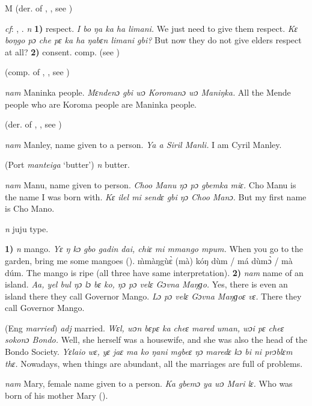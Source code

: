 \begin{letter}{M}
 (der. of , , see ) 

 \textit{cf}: , . \textit{n} \textbf{1)} respect. \textit{I bo ŋa ka ha limani.} We just need to give them respect. \textit{Kɛ boŋgo pɔ che pɛ ka ha ŋabɛn limani gbi?} But now they do not give elders respect at all? \textbf{2)} consent. comp.  (see ) 

 (comp. of , , see ) 

 \textit{nam} Maninka people. \textit{Mɛndenɔ gbi wɔ Koromanɔ wɔ Maniŋka.} All the Mende people who are Koroma people are Maninka people.

 (der. of , , see ) 

 \textit{nam} Manley, name given to a person. \textit{Ya a Siril Manli.} I am Cyril Manley.

 (Port \textit{manteiga} ‘butter') \textit{n} butter.

 \textit{nam} Manu, name given to person. \textit{Choo Manu ŋɔ pɔ gbemka miɛ.} Cho Manu is the name I was born with. \textit{Kɛ ilel mi sendɛ gbi ŋɔ Choo Manɔ.} But my first name is Cho Mano.

 \textit{n} juju type.

 \textbf{1)} \textit{n} mango. \textit{Yɛ ŋ kɔ gbo gadin dai, chiɛ mi mmango mpum.}	When you go to the garden, bring me some mangoes (\citealt{Pichl1967}). m̀màŋgùɛ̀ (mà) kóŋ dùm / má dùmɔ̀ / mà dúm. The mango is ripe (all three have same interpretation). \textbf{2)} \textit{nam} name of an island. \textit{Aa, yel bul ŋɔ lɔ bɛ ko, ŋɔ pɔ velɛ Gɔvna Maŋɡo.} Yes, there is even an island there they call Governor Mango. \textit{Lɔ pɔ velɛ Gɔvna Maŋɡoɛ vɛ.} There they call Governor Mango. 

 (Eng \textit{married}) \textit{adj} married. \textit{Wɛl, wɔn bɛpɛ ka cheɛ mared uman, wɔi pɛ cheɛ sokonɔ Bondo.} Well, she herself was a housewife, and she was also the head of the Bondo Society. \textit{Yɛlaio wɛ, yɛ jaɛ ma ko ŋani mgbeɛ ŋɔ maredɛ kɔ bi ni prɔblɛm thɛ.} Nowadays, when things are abundant, all the marriages are full of problems.

 \textit{nam} Mary, female name given to a person. \textit{Ka gbemɔ ya wɔ Mari lɛ.} Who was born of his mother Mary (\citealt{Pichl1967}).


\end{letter}
